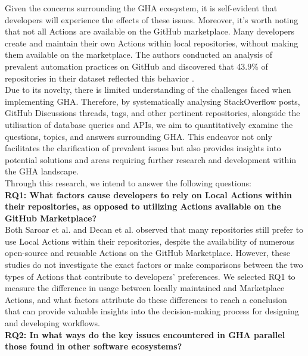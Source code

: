 \documentclass[conference]{IEEEtran}
\begin{document}
    Given the concerns surrounding the GHA ecosystem, it is self-evident that developers will experience the effects of these issues.  Moreover, it's worth noting that not all Actions are available on the GitHub marketplace. Many developers create and maintain their own Actions within local repositories, without making them available on the marketplace. The authors  conducted an analysis of prevalent automation practices on GitHub and discovered that 43.9\% of repositories in their dataset reflected this behavior \cite{decan2022use}.\\
    Due to its novelty, there is limited understanding of the challenges faced when implementing GHA.  
    Therefore,  by systematically analysing StackOverflow posts, GitHub Discussions threads, tags, and other pertinent repositories, alongside the utilisation of database queries and APIs, we aim to quantitatively examine the questions, topics, and answers surrounding GHA. This endeavor not only facilitates the clarification of prevalent issues but also provides insights into potential solutions and areas requiring further research and development within the GHA landscape.\\

    Through this research, we intend to answer the following questions:\\


    \textbf{RQ1: What factors cause developers to rely on Local Actions within their repositories, as opposed to utilizing Actions available on the GitHub Marketplace?}\\

    Both Saroar et al. \cite{saroar2023developers} and Decan et al. \cite{decan2022use} observed that many repositories still prefer to use Local Actions within their repositories, despite the availability of numerous open-source and reusable Actions on the GitHub Marketplace. However, these studies do not investigate the exact factors or make comparisons between the two types of Actions that contribute to developers' preferences. We selected RQ1 to measure the difference in usage between locally maintained and Marketplace Actions, and what factors attribute do these differences to reach a conclusion that can provide valuable insights into the decision-making process for designing and developing workflows. \\

 \textbf{RQ2: In what ways do the key issues encountered in GHA parallel those found in other software ecosystems?}\\
\end{document}
